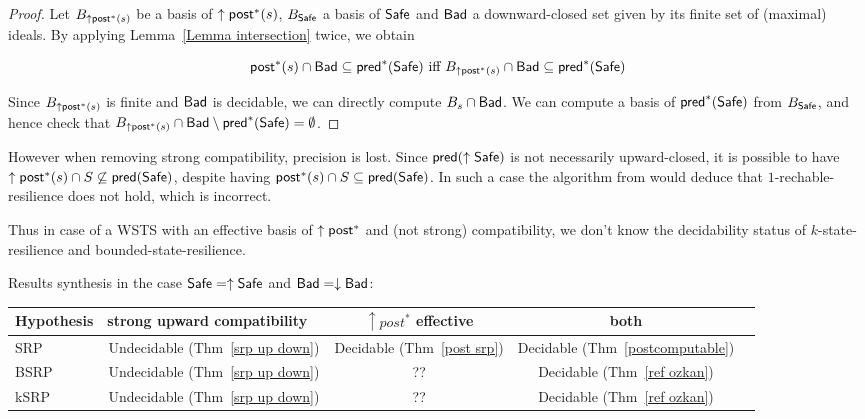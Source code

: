 \begin{proof}
Let $B_{\uparrow \textsf{post}^*(s)}$ 
 be a basis of $\uparrow \textsf{post}^*(s)$, $B_{\textsf{Safe}}$ a basis of $\textsf{Safe}$
and $\textsf{Bad}$ a downward-closed set given by its finite set of (maximal) ideals.
By applying Lemma~\ref{Lemma intersection} twice, we obtain

$$ \textsf{post}^*(s) \cap \textsf{Bad} \subseteq \textsf{pred}^*(\textsf{Safe}) \text{ iff } B_{\uparrow \textsf{post}^*(s)} \cap \textsf{Bad} \subseteq \textsf{pred}^*(\textsf{Safe})$$

Since $B_{\uparrow \textsf{post}^*(s)}$ is finite and $\textsf{Bad}$ is decidable, we can directly compute $ B_s \cap \textsf{Bad}$.
We can compute a basis of $\textsf{pred}^*(\textsf{Safe})$ from $B_{\textsf{Safe}}$, and hence check that $B_{\uparrow \textsf{post}^*(s)} \cap \textsf{Bad} \setminus \textsf{pred}^*(\textsf{Safe}) = \emptyset$. 
\end{proof}

%
%



However when removing strong compatibility, precision is lost.
Since $\textsf{pred}(\uparrow \textsf{Safe})$ is not necessarily upward-closed, it is possible to have 
 $\uparrow \textsf{post}^* (s) \cap S \not\subseteq \textsf{pred}(\textsf{Safe})$,
despite having 
$\textsf{post}^* (s) \cap S \subseteq \textsf{pred}( \textsf{Safe})$.
In such a case the algorithm from
\cite{DBLP:conf/gg/Ozkan22} would deduce that $1$-rechable-resilience does not hold,
which is incorrect.

Thus in case of a WSTS with an effective basis of $\uparrow \textsf{post}^*$ and (not strong) compatibility, we don't know the decidability status of {\sc $k$-state-resilience} and 
{\sc bounded-state-resilience}. 


Results synthesis in the case $\textsf{Safe} = \uparrow \textsf{Safe}$ and $\textsf{Bad} = \downarrow \textsf{Bad}$:


\begin{center}
\begin{tabular}{ | l | c | c | c | c |}
\hline  Hypothesis & strong upward compatibility ~ & $\uparrow post^*$ effective & both  \\ \hline
   SRP & Undecidable (Thm~\ref{srp up down}) & Decidable (Thm~\ref{post srp})  & Decidable (Thm~\ref{postcomputable})\\ \hline
   BSRP & Undecidable (Thm~\ref{srp up down}) &  ??  & Decidable (Thm~\ref{ref ozkan}) \\ \hline
      kSRP & Undecidable (Thm~\ref{srp up down}) & ?? & Decidable (Thm~\ref{ref ozkan}) \\ \hline
 \end{tabular}
\end{center}


